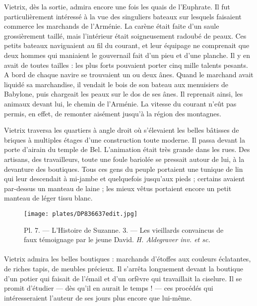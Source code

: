 \documentclass[a4paper, 11pt, oneside, polutonikogreek, french]{article}
\begin{document}
Vietrix, dès la sortie, admira encore une fois les quais de l'Euphrate. Il fut particulièrement intéressé à la vue des singuliers bateaux sur lesquels faisaient commerce les marchands de l'Arménie. La carène était faite d'un saule grossièrement taillé, mais l'intérieur était soigneusement radoubé de peaux. Ces petits bateaux naviguaient au fil du courant, et leur équipage ne comprenait que deux hommes qui maniaient le gouvernail fait d'un pieu et d'une planche. Il y en avait de toutes tailles : les plus forts pouvaient porter cinq mille talents pesants. A bord de chaque navire se trouvaient un ou deux ânes. Quand le marchand avait liquidé sa marchandise, il vendait le bois de son bateau aux menuisiers de Babylone, puis chargeait les peaux sur le dos de ses ânes. Il reprenait ainsi, les animaux devant lui, le chemin de l'Arménie. La vitesse du courant n'eût pas permis, en effet, de remonter aisément jusqu'à la région des montagnes.

\bigskip
\centerline{\EightStarTaper}
\centerline{\EightStarTaper\EightStarTaper}
\bigskip

Vietrix traversa les quartiers à angle droit où s'élevaient les belles bâtisses de briques à multiples étages d'une construction toute moderne. Il passa devant la porte d'airain du temple de Bel. L'animation était très grande dans les rues. Des artisans, des travailleurs, toute une foule bariolée se pressait autour de lui, à la devanture des boutiques. Tous ces gens du peuple portaient une tunique de lin qui leur descendait à mi-jambe et quelquefois jusqu'aux pieds ; certains avaient par-dessus un manteau de laine ; les mieux vêtus portaient encore un petit manteau de léger tissu blanc.
\clearpage
\vspace*{\fill}
\begin{figure}[H]
\centering
\texttt{[image: plates/DP836637edit.jpg]}
\caption{\Fontauri Pl. 7. --- L'Histoire de Suzanne. 3. --- Les vieillards convaincus de faux témoignage par le jeune David. \emph{H. Aldegraver inv. et sc.}}
\end{figure}
\vspace*{\fill}
\clearpage
\paragraph{}
Vietrix admira les belles boutiques : marchands d'étoffes aux couleurs éclatantes, de riches tapis, de meubles précieux. Il s'arrêta longuement devant la boutique d'un potier qui faisait de l'émail et d'un orfèvre qui travaillait la ciselure. Il se promit d'étudier --- dès qu'il en aurait le temps ! --- ces procédés qui intéresseraient l'auteur de ses jours plus encore que lui-même.
\end{document}
